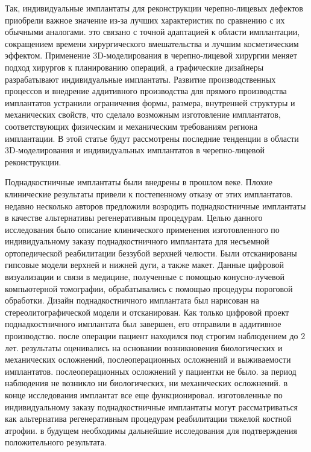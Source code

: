 Так, индивидуальные имплантаты для реконструкции черепно-лицевых дефектов приобрели
важное значение из-за лучших характеристик по сравнению с их обычными аналогами.
это связано с точной адаптацией к области имплантации, сокращением времени
хирургического вмешательства и лучшим косметическим эффектом. Применение
3D-моделирования в черепно-лицевой хирургии меняет подход хирургов к
планированию операций, а графические дизайнеры разрабатывают индивидуальные
имплантаты. Развитие производственных процессов и внедрение аддитивного
производства для прямого производства имплантатов устранили ограничения формы,
размера, внутренней структуры и механических свойств, что сделало возможным
изготовление имплантатов, соответствующих физическим и механическим требованиям
региона имплантации. В этой статье будут рассмотрены последние тенденции в
области 3D-моделирования и индивидуальных имплантатов в черепно-лицевой
реконструкции.\cite{parthasarathy2014}

Поднадкостничные имплантаты были внедрены в прошлом веке. Плохие клинические
результаты привели к постепенному отказу от этих имплантатов. недавно несколько
авторов предложили возродить поднадкостничные имплантаты в качестве альтернативы
регенеративным процедурам. Целью данного исследования было описание клинического
применения изготовленного по индивидуальному заказу поднадкостничного имплантата
для несъемной ортопедической реабилитации беззубой верхней челюсти. Были
отсканированы гипсовые модели верхней и нижней дуги, а также макет. Данные
цифровой визуализации и связи в медицине, полученные с помощью конусно-лучевой
компьютерной томографии, обрабатывались с помощью процедуры пороговой обработки.
Дизайн поднадкостничного имплантата был нарисован на стереолитографической
модели и отсканирован. Как только цифровой проект поднадкостничного имплантата
был завершен, его отправили в аддитивное производство. после операции пациент
находился под строгим наблюдением до 2 лет. результаты оценивались на основании
возникновения биологических и механических осложнений, послеоперационных
осложнений и выживаемости имплантатов. послеоперационных осложнений у пациентки
не было. за период наблюдения не возникло ни биологических, ни механических
осложнений. в конце исследования имплантат все еще функционировал. изготовленные
по индивидуальному заказу поднадкостничные имплантаты могут рассматриваться как
альтернатива регенеративным процедурам реабилитации тяжелой костной атрофии. в
будущем необходимы дальнейшие исследования для подтверждения положительного
результата.\cite{strappa2022}


